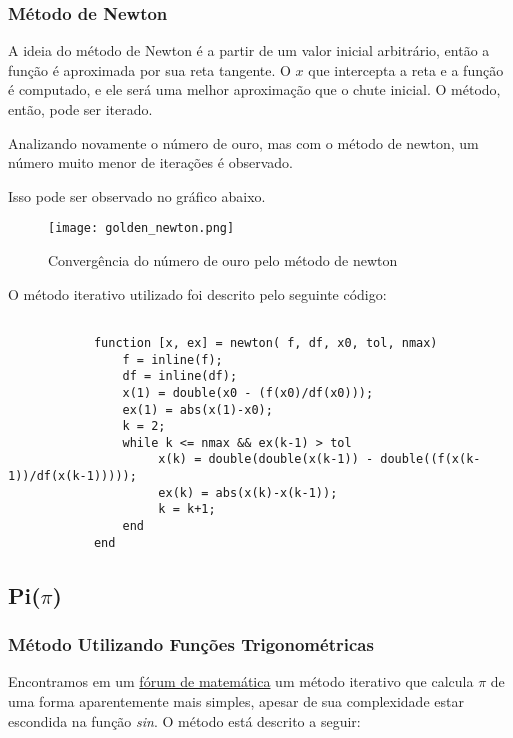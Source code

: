 		\subsubsection{Método de Newton}

			A ideia do método de Newton é a partir de um valor inicial
			arbitrário, então a função é aproximada por sua reta tangente. O $x$
			que intercepta a reta e a função é computado, e ele será uma melhor
			aproximação que o chute inicial. O método, então, pode ser iterado.

			Analizando novamente o número de ouro, mas com o método de newton,
			um número muito menor de iterações é observado.

			

			Isso pode ser observado no gráfico abaixo.

			\begin{figure}[H]
				\centering
				\texttt{[image: golden\_newton.png]}
				\caption{Convergência do número de ouro pelo método de newton}
				\label{golden_newton}
			\end{figure}

			O método iterativo utilizado foi descrito pelo seguinte código:

			\begin{lstlisting}

			function [x, ex] = newton( f, df, x0, tol, nmax)
				f = inline(f);
				df = inline(df);
				x(1) = double(x0 - (f(x0)/df(x0)));
				ex(1) = abs(x(1)-x0);
				k = 2;
				while k <= nmax && ex(k-1) > tol
					 x(k) = double(double(x(k-1)) - double((f(x(k-1))/df(x(k-1)))));
					 ex(k) = abs(x(k)-x(k-1));
					 k = k+1;
				end
			end

			\end{lstlisting}

	\subsection{Pi($\pi$)}

		\subsubsection{Método Utilizando Funções Trigonométricas}

			Encontramos em um
			\href{http://mathforum.org/library/drmath/view/65244.html}{fórum de
			matemática} um método iterativo que calcula $ \pi $ de uma forma
			aparentemente mais simples, apesar de sua complexidade estar
			escondida na função \emph{sin}. O método está descrito a seguir:

